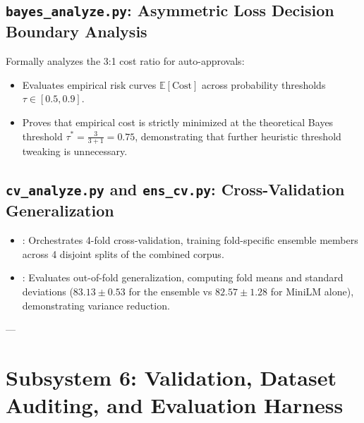 \documentclass[11pt,a4paper]{article}
\begin{document}
\subsection{\texttt{bayes\_analyze.py}: Asymmetric Loss Decision Boundary Analysis}
Formally analyzes the 3:1 cost ratio for auto-approvals:
\begin{itemize}
  \item Evaluates empirical risk curves $\mathbb{E}[\text{Cost}]$ across probability thresholds $\tau \in [0.5, 0.9]$.
  \item Proves that empirical cost is strictly minimized at the theoretical Bayes threshold $\tau^* = \frac{3}{3 + 1} = 0.75$, demonstrating that further heuristic threshold tweaking is unnecessary.
\end{itemize}

\subsection{\texttt{cv\_analyze.py} and \texttt{ens\_cv.py}: Cross-Validation Generalization}
\begin{itemize}
  \item {}: Orchestrates 4-fold cross-validation, training fold-specific ensemble members across 4 disjoint splits of the combined corpus.
  \item {}: Evaluates out-of-fold generalization, computing fold means and standard deviations ($83.13 \pm 0.53$ for the ensemble vs $82.57 \pm 1.28$ for MiniLM alone), demonstrating variance reduction.
\end{itemize}

---

\section{Subsystem 6: Validation, Dataset Auditing, and Evaluation Harness}
\end{document}
